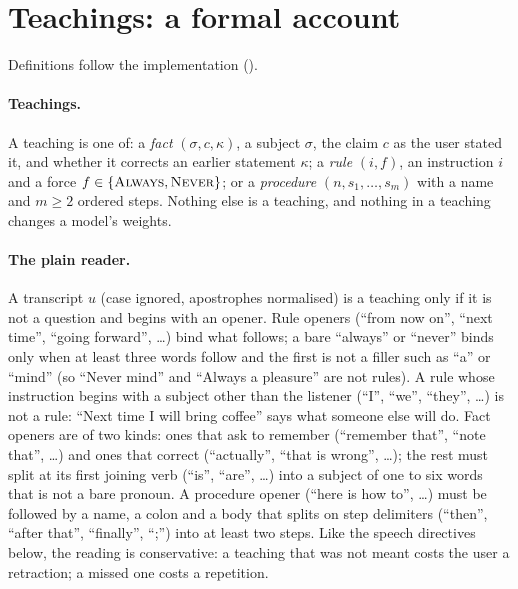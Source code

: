 
\section{Teachings: a formal account}\label{sec:teachings}

Definitions follow the implementation ().

\paragraph{Teachings.}
A teaching is one of: a \emph{fact} $(\sigma,c,\kappa)$, a subject $\sigma$, the claim $c$ as the user stated it, and whether it corrects an
earlier statement $\kappa$; a \emph{rule} $(i,f)$, an instruction $i$ and a force $f\in\{\textsc{Always},\textsc{Never}\}$; or a \emph{procedure}
$(n,s_1,\ldots,s_m)$ with a name and $m\ge2$ ordered steps. Nothing else is a teaching, and nothing in a teaching changes a model's weights.

\paragraph{The plain reader.}
A transcript $u$ (case ignored, apostrophes normalised) is a teaching only if it is not a question and begins with an opener. Rule openers (``from now
on'', ``next time'', ``going forward'', \ldots) bind what follows; a bare ``always'' or ``never'' binds only when at least three words follow and the
first is not a filler such as ``a'' or ``mind'' (so ``Never mind'' and ``Always a pleasure'' are not rules). A rule whose instruction begins with a
subject other than the listener (``I'', ``we'', ``they'', \ldots) is not a rule: ``Next time I will bring coffee'' says what someone else will do. Fact openers
are of two kinds: ones that ask to remember (``remember that'', ``note that'', \ldots) and ones that correct (``actually'', ``that is wrong'', \ldots); the rest
must split at its first joining verb (``is'', ``are'', \ldots) into a subject of one to six words that is not a bare pronoun. A procedure opener
(``here is how to'', \ldots) must be followed by a name, a colon and a body that splits on step delimiters (``then'', ``after that'', ``finally'', ``;'')
into at least two steps. Like the speech directives below, the reading is conservative: a teaching that was not meant costs the user a retraction; a
missed one costs a repetition.

